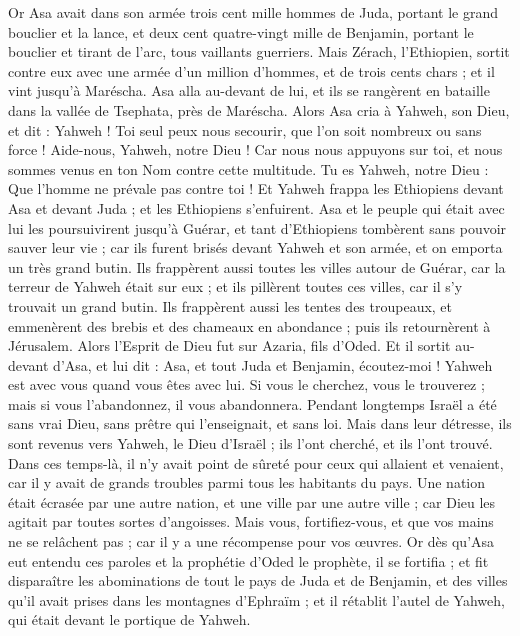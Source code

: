 \begin{multicols}{2}
Or Asa avait dans son armée trois cent mille hommes de Juda, portant le grand bouclier et la lance, et deux cent quatre-vingt mille de Benjamin, portant le bouclier et tirant de l'arc, tous vaillants guerriers.
Mais Zérach, l'Ethiopien, sortit contre eux avec une armée d'un million d'hommes, et de trois cents chars ; et il vint jusqu'à Maréscha.
Asa alla au-devant de lui, et ils se rangèrent en bataille dans la vallée de Tsephata, près de Maréscha.
Alors Asa cria à Yahweh, son Dieu, et dit : Yahweh ! Toi seul peux nous secourir, que l'on soit nombreux ou sans force ! Aide-nous, Yahweh, notre Dieu ! Car nous nous appuyons sur toi, et nous sommes venus en ton Nom contre cette multitude. Tu es Yahweh, notre Dieu : Que l'homme ne prévale pas contre toi !
Et Yahweh frappa les Ethiopiens devant Asa et devant Juda ; et les Ethiopiens s'enfuirent.
Asa et le peuple qui était avec lui les poursuivirent jusqu'à Guérar, et tant d'Ethiopiens tombèrent sans pouvoir sauver leur vie ; car ils furent brisés devant Yahweh et son armée, et on emporta un très grand butin.
Ils frappèrent aussi toutes les villes autour de Guérar, car la terreur de Yahweh était sur eux ; et ils pillèrent toutes ces villes, car il s'y trouvait un grand butin.
Ils frappèrent aussi les tentes des troupeaux, et emmenèrent des brebis et des chameaux en abondance ; puis ils retournèrent à Jérusalem.
\VerseOne{}Alors l'Esprit de Dieu fut sur Azaria, fils d'Oded.
Et il sortit au-devant d'Asa, et lui dit : Asa, et tout Juda et Benjamin, écoutez-moi ! Yahweh est avec vous quand vous êtes avec lui. Si vous le cherchez, vous le trouverez ; mais si vous l'abandonnez, il vous abandonnera.
Pendant longtemps Israël a été sans vrai Dieu, sans prêtre qui l'enseignait, et sans loi.
Mais dans leur détresse, ils sont revenus vers Yahweh, le Dieu d'Israël ; ils l'ont cherché, et ils l'ont trouvé.
Dans ces temps-là, il n'y avait point de sûreté pour ceux qui allaient et venaient, car il y avait de grands troubles parmi tous les habitants du pays.
Une nation était écrasée par une autre nation, et une ville par une autre ville ; car Dieu les agitait par toutes sortes d'angoisses.
Mais vous, fortifiez-vous, et que vos mains ne se relâchent pas ; car il y a une récompense pour vos œuvres.
Or dès qu'Asa eut entendu ces paroles et la prophétie d'Oded le prophète, il se fortifia ; et fit disparaître les abominations de tout le pays de Juda et de Benjamin, et des villes qu'il avait prises dans les montagnes d'Ephraïm ; et il rétablit l'autel de Yahweh, qui était devant le portique de Yahweh.

\end{multicols}
